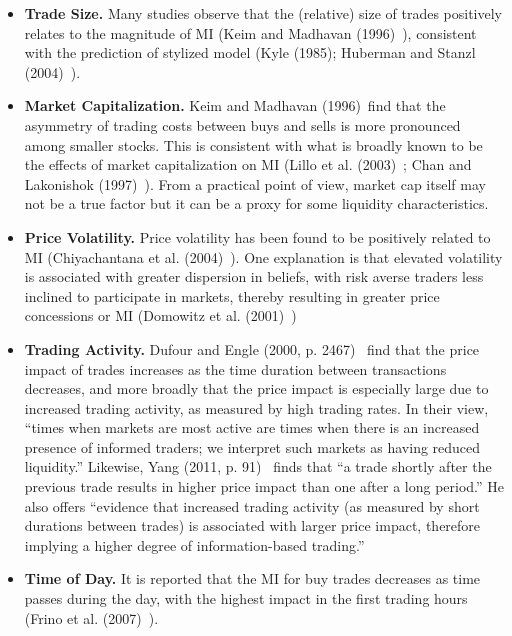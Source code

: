 \begin{itemize}
\item \textbf{Trade Size.} Many studies observe that the (relative) size of trades positively relates to the magnitude of MI (Keim and Madhavan (1996)~\cite{madhavan}), consistent with the prediction of stylized model (Kyle (1985)\cite{kyle1985}; Huberman and Stanzl (2004)~\cite{huberstan}).

\item \textbf{Market Capitalization.} Keim and Madhavan (1996)~\cite{keim1996}find that the asymmetry of trading costs between buys and sells is more pronounced among smaller stocks. This is consistent with what is broadly known to be the effects of market capitalization on MI (Lillo et al. (2003)~\cite{farmermantegna}; Chan and Lakonishok (1997)~\cite{chan1997}). From a practical point of view, market cap itself may not be a true factor but it can be a proxy for some liquidity characteristics. 

\item \textbf{Price Volatility.} Price volatility has been found to be positively related to MI (Chiyachantana et al. (2004)~\cite{chiya2004}). One explanation is that elevated volatility is associated with greater dispersion in beliefs, with risk averse traders less inclined to participate in markets, thereby resulting in greater price concessions or MI (Domowitz et al. (2001)~\cite{domo2001})

\item \textbf{Trading Activity.} Dufour and Engle (2000, p. 2467)~\cite{dufour} find that the price impact of trades increases as the time duration between transactions decreases, and more broadly that the price impact is especially large due to increased trading activity, as measured by high trading rates. In their view, ``times when markets are most active are times when there is an increased presence of informed traders; we interpret such markets as having reduced liquidity.'' Likewise, Yang (2011, p. 91)~\cite{yang2011} finds that ``a trade shortly after the previous trade results in higher price impact than one after a long period.'' He also offers ``evidence that increased trading activity (as measured by short durations between trades) is associated with larger price impact, therefore implying a higher degree of information-based trading.''

\item \textbf{Time of Day.} It is reported that the MI for buy trades decreases as time passes during the day, with the highest impact in the first trading hours (Frino et al. (2007)~\cite{frino}).
\end{itemize}


